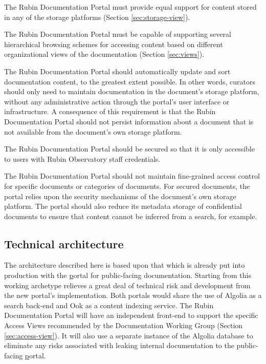 The Rubin Documentation Portal must provide equal support for content stored in any of the storage platforms (Section \ref{sec:storage-view}).

The Rubin Documentation Portal must be capable of supporting several hierarchical browsing schemes for accessing content based on different organizational views of the documentation (Section \ref{sec:views}).

The Rubin Documentation Portal should automatically update and sort documentation content, to the greatest extent possible.
In other words, curators should only need to maintain documentation in the document's storage platform, without any administrative action through the portal's user interface or infrastructure.
A consequence of this requirement is that the Rubin Documentation Portal should not persist information about a document that is not available from the document's own storage platform.

The Rubin Documentation Portal should be secured so that it is only accessible to users with Rubin Observatory staff credentials.

The Rubin Documentation Portal should not maintain fine-grained access control for specific documents or categories of documents.
For secured documents, the portal relies upon the security mechanisms of the document's own storage platform.
The portal should also reduce its metadata storage of confidential documents to ensure that content cannot be inferred from a search, for example.


\subsection{Technical architecture}

The architecture described here is based upon that which is already put into production with the \href{www.lsst.io} portal for public-facing documentation.
Starting from this working archetype relieves a great deal of technical risk and development from the new portal's implementation.
Both portals would share the use of Algolia \citep{Algolia-cite} as a search back-end and Ook \citep{ook-cite} as a content indexing service.
The Rubin Documentation Portal will have an independent front-end to support the specific Access Views recommended by the Documentation Working Group (Section \ref{sec:access-view}).
It will also use a separate instance of the Algolia database to eliminate any risks associated with leaking internal documentation to the public-facing \href{www.lsst.io} portal.

